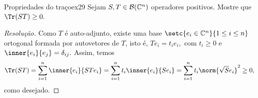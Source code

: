 \begin{exercício}{Propriedades do traço}{ex29}
    Sejam \(S, T \in \mathcal{B}(\mathbb{C}^n)\) operadores positivos. Mostre que \(\Tr(ST) \geq 0.\)
\end{exercício}
\begin{proof}[Resolução]
  Como \(T\) é auto-adjunto, existe uma base \(\setc{e_i \in \mathbb{C}^n}{1 \leq i \leq n}\) ortogonal formada por autovetores de \(T\), isto é, \(Te_i = t_ie_i,\) com \(t_i \geq 0\) e \(\inner{e_i}{e_j} = \delta_{ij}.\) Assim, temos
  \begin{equation*}
    \Tr(ST) = \sum_{i = 1}^n \inner{e_i}{STe_i} = \sum_{i = 1}^n t_i\inner{e_i}{Se_i} = \sum_{i = 1}^n t_i \norm{\sqrt{S} e_i}^2 \geq 0,
  \end{equation*}
  como desejado.
\end{proof}
